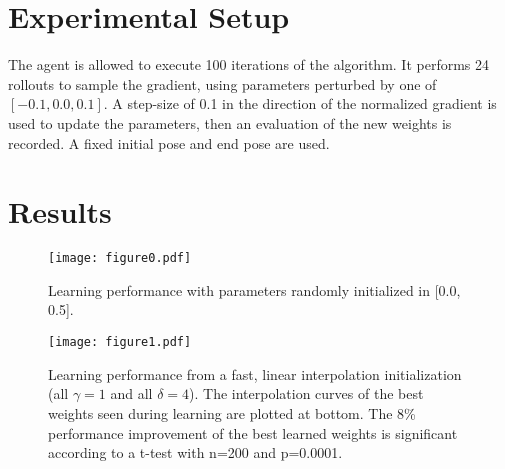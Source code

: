 \documentclass{article}
\begin{document}
\section{Experimental Setup}

The agent is allowed to execute 100 iterations of the algorithm. It performs 24 rollouts to sample the gradient, using parameters perturbed by one of $[-0.1, 0.0, 0.1]$. A step-size of 0.1 in the direction of the normalized gradient is used to update the parameters, then an evaluation of the new weights is recorded. A fixed initial pose and end pose are used.



\section{Results}

\begin{figure}[H]
	\texttt{[image: figure0.pdf]}
	\caption{Learning performance with parameters randomly initialized in [0.0, 0.5].}
\end{figure}


\begin{figure}[H]
	\begin{center}
		\texttt{[image: figure1.pdf]}
		\caption{Learning performance from a fast, linear interpolation initialization (all $\gamma = 1$ and all $\delta = 4$). The interpolation curves of the best weights seen during learning are plotted at bottom. The 8\% performance improvement of the best learned weights is significant according to a t-test with n=200 and p=0.0001.}
	\end{center}
\end{figure}
	
\end{document}
